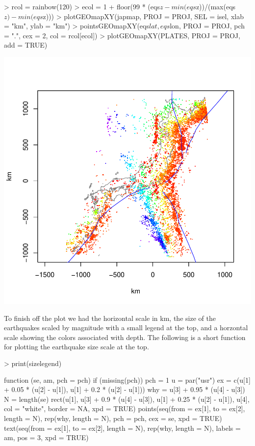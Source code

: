 \documentclass{article}
\begin{document}
\begin{Schunk}
\begin{Sinput}
> rcol = rainbow(120)
> ecol = 1 + floor(99 * (eqs$z - min(eqs$z))/(max(eqs$z) - min(eqs$z)))
> plotGEOmapXY(japmap, PROJ = PROJ, SEL = isel, xlab = "km", ylab = "km")
> pointsGEOmapXY(eqs$lat, eqs$lon, PROJ = PROJ, pch = ".", cex = 2, 
     col = rcol[ecol])
> plotGEOmapXY(PLATES, PROJ = PROJ, add = TRUE)
\end{Sinput}
\end{Schunk}
\includegraphics{gmap-020}

To finish off the plot we had the horizontal scale in km, the
size of the earthquakes scaled by magnitude with a small legend at the top,
and a horzontal scale showing the colors associated with depth.
The following is a short function for plotting the 
earthquake size scale at the top.
\begin{Schunk}
\begin{Sinput}
> print(sizelegend)
\end{Sinput}
\begin{Soutput}
function (se, am, pch = pch) 
{
    if (missing(pch)) 
        pch = 1
    u = par("usr")
    ex = c(u[1] + 0.05 * (u[2] - u[1]), u[1] + 0.2 * (u[2] - 
        u[1]))
    why = u[3] + 0.95 * (u[4] - u[3])
    N = length(se)
    rect(u[1], u[3] + 0.9 * (u[4] - u[3]), u[1] + 0.25 * (u[2] - 
        u[1]), u[4], col = "white", border = NA, xpd = TRUE)
    points(seq(from = ex[1], to = ex[2], length = N), rep(why, 
        length = N), pch = pch, cex = se, xpd = TRUE)
    text(seq(from = ex[1], to = ex[2], length = N), rep(why, 
        length = N), labels = am, pos = 3, xpd = TRUE)
}
\end{Soutput}
\end{Schunk}
\end{document}
